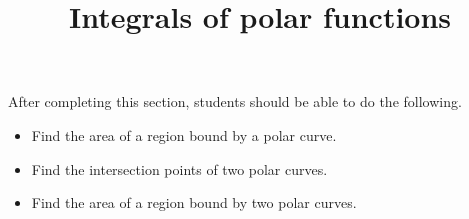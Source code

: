 \documentclass{ximera}
\title{Integrals of polar functions}
\begin{document}
\begin{abstract}
\end{abstract}

\maketitle

\begin{sectionOutcomes}

After completing this section, students should be able to do the following.

\begin{itemize}
\item Find the area of a region bound by a polar curve.
\item Find the intersection points of two polar curves. 
\item Find the area of a region bound by two polar curves. 
\end{itemize}

\end{sectionOutcomes}
\end{document}
